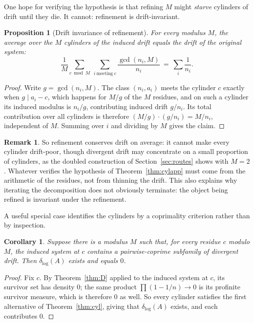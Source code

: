 \documentclass[11pt]{article}
\theoremstyle{plain}
\newtheorem{proposition}[theorem]{Proposition}
\newtheorem{corollary}[theorem]{Corollary}
\theoremstyle{definition}
\newtheorem{remark}[theorem]{Remark}
\newcommand{\dlog}{\delta_{\log}}
\begin{document}
One hope for verifying the hypothesis is that refining $M$
might \emph{starve} cylinders of drift until they die.  It
cannot: refinement is drift-invariant.

\begin{proposition}[Drift invariance of refinement]\label{prop:driftinv}
For every modulus $M$, the average over the $M$ cylinders of the
induced drift equals the drift of the original system:
\[
  \frac1M\sum_{c\bmod M}\ \sum_{i\ \text{meeting}\ c}
  \frac{\gcd(n_i,M)}{n_i}\ =\ \sum_i\frac1{n_i}.
\]
\end{proposition}

\begin{proof}
Write $g=\gcd(n_i,M)$.  The class $(n_i,a_i)$ meets the cylinder
$c$ exactly when $g\mid a_i-c$, which happens for $M/g$ of the
$M$ residues, and on such a cylinder its induced modulus is
$n_i/g$, contributing induced drift $g/n_i$.  Its total
contribution over all cylinders is therefore
$(M/g)\cdot(g/n_i)=M/n_i$, independent of $M$.  Summing over $i$
and dividing by $M$ gives the claim.
\end{proof}

\begin{remark}
So refinement conserves drift on average: it cannot make every
cylinder drift-poor, though divergent drift may concentrate on
a small proportion of cylinders, as the doubled construction of
Section~\ref{sec:routes} shows with $M=2$.  Whatever verifies
the hypothesis of Theorem~\ref{thm:cylapp} must come from the
arithmetic of the residues, not from thinning the drift.  This
also explains why iterating the decomposition does not obviously
terminate: the object being refined is invariant under the
refinement.
\end{remark}

A useful special case identifies the cylinders by a coprimality
criterion rather than by inspection.

\begin{corollary}\label{cor:dense}
Suppose there is a modulus $M$ such that, for every residue $c$
modulo $M$, the induced system at $c$ contains a pairwise-coprime
subfamily of divergent drift.  Then $\dlog(A)$ exists and equals
$0$.
\end{corollary}

\begin{proof}
Fix $c$.  By Theorem~\ref{thm:D} applied to the induced system
at $c$, its survivor set has density $0$; the same product
$\prod(1-1/n)\to0$ is its profinite survivor measure, which is
therefore $0$ as well.  So every cylinder satisfies the first
alternative of Theorem~\ref{thm:cyl}, giving that $\dlog(A)$
exists, and each contributes $0$.
\end{proof}
\end{document}
